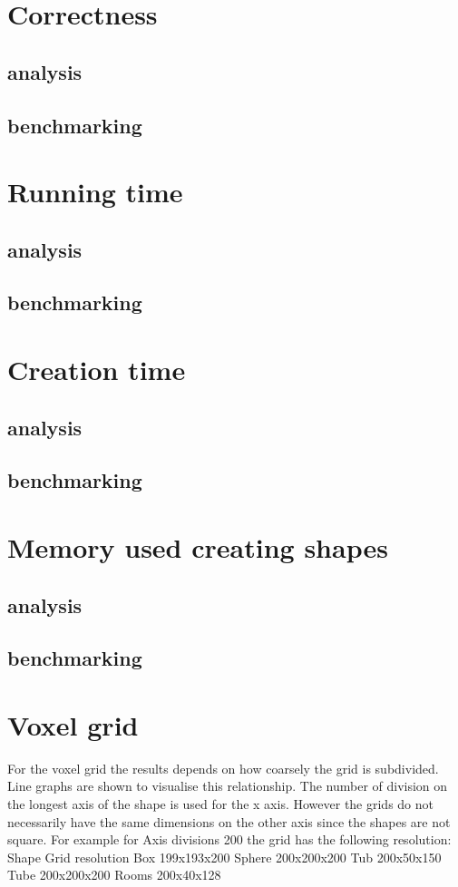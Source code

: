 \documentclass[11pt,twoside,a4paper]{report}
\begin{document}
\section{Correctness}
\subsection{analysis}
\subsection{benchmarking}

\section{Running time}
\subsection{analysis}
\subsection{benchmarking}

\section{Creation time}
\subsection{analysis}
\subsection{benchmarking}

\section{Memory used creating shapes}
\subsection{analysis}
\subsection{benchmarking}
    



\section{Voxel grid}
For the voxel grid the results depends on how coarsely the grid is subdivided. Line graphs are shown to visualise this relationship. The number of division on the longest axis of the shape is used for the x axis. However the grids do not necessarily have the same dimensions on the other axis since the shapes are not square. For example for Axis divisions 200 the grid has the following resolution:
Shape
Grid resolution
Box
199x193x200
Sphere
200x200x200
Tub
200x50x150
Tube
200x200x200
Rooms
200x40x128
\end{document}
